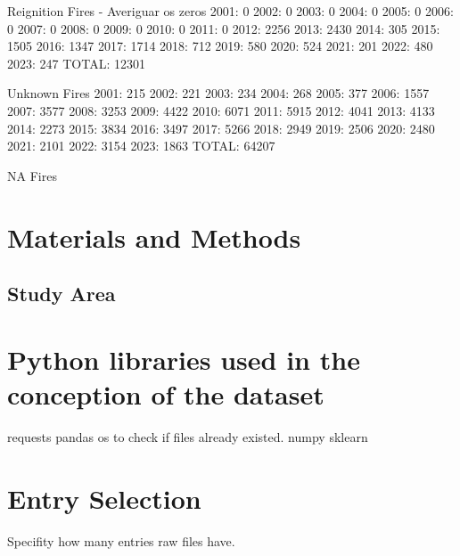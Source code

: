 Reignition Fires - Averiguar os zeros
2001: 0
2002: 0
2003: 0
2004: 0
2005: 0
2006: 0
2007: 0
2008: 0
2009: 0
2010: 0
2011: 0
2012: 2256
2013: 2430
2014: 305
2015: 1505
2016: 1347
2017: 1714
2018: 712
2019: 580
2020: 524
2021: 201
2022: 480
2023: 247
TOTAL: 12301

Unknown Fires
2001: 215
2002: 221
2003: 234
2004: 268
2005: 377
2006: 1557
2007: 3577
2008: 3253
2009: 4422
2010: 6071
2011: 5915
2012: 4041
2013: 4133
2014: 2273
2015: 3834
2016: 3497
2017: 5266
2018: 2949
2019: 2506
2020: 2480
2021: 2101
2022: 3154
2023: 1863
TOTAL: 64207

NA Fires


\section{Materials and Methods}

\subsection{Study Area}







\section{Python libraries used in the conception of the dataset}
requests
pandas
os to check if files already existed.
numpy
sklearn



\section{Entry Selection}
Specifity how many entries raw files have.
